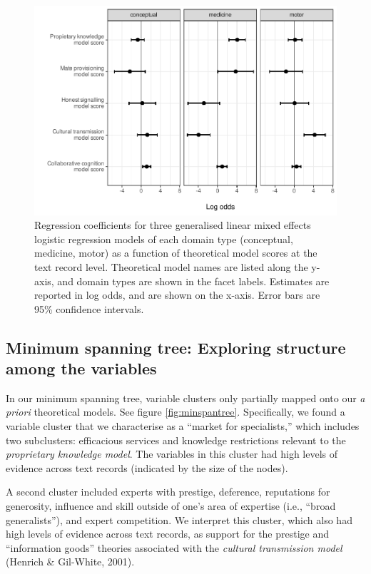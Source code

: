 \documentclass[
  11pt,
]{article}
\begin{document}
\begin{figure}
\centering
\includegraphics{conceptual-experts-paper_files/figure-latex/domainModels-1.pdf}
\caption{\label{fig:domainModels}Regression coefficients for three generalised linear mixed effects logistic regression models of each domain type (conceptual, medicine, motor) as a function of theoretical model scores at the text record level. Theoretical model names are listed along the y-axis, and domain types are shown in the facet labels. Estimates are reported in log odds, and are shown on the x-axis. Error bars are 95\% confidence intervals.}
\end{figure}

\hypertarget{minimum-spanning-tree-exploring-structure-among-the-variables}{%
\subsection{Minimum spanning tree: Exploring structure among the variables}\label{minimum-spanning-tree-exploring-structure-among-the-variables}}

In our minimum spanning tree, variable clusters only partially mapped onto our \emph{a priori} theoretical models. See figure \ref{fig:minspantree}. Specifically, we found a variable cluster that we characterise as a ``market for specialists,'' which includes two subclusters: efficacious services and knowledge restrictions relevant to the \emph{proprietary knowledge model}. The variables in this cluster had high levels of evidence across text records (indicated by the size of the nodes).

A second cluster included experts with prestige, deference, reputations for generosity, influence and skill outside of one's area of expertise (i.e., ``broad generalists''), and expert competition. We interpret this cluster, which also had high levels of evidence across text records, as support for the prestige and ``information goods'' theories associated with the \emph{cultural transmission model} (Henrich \& Gil-White, 2001).
\end{document}
